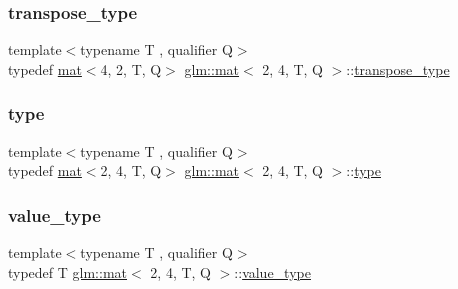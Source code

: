 \mbox{\label{structglm_1_1mat_3_012_00_014_00_01_t_00_01_q_01_4_a5030a7f34454a6871ed17c1b27cc0929}} 
\subsubsection{\texorpdfstring{transpose\+\_\+type}{transpose\_type}}
{\footnotesize\ttfamily template$<$typename T , qualifier Q$>$ \\
typedef \mbox{\hyperlink{structglm_1_1mat}{mat}}$<$4, 2, T, Q$>$ \mbox{\hyperlink{structglm_1_1mat}{glm\+::mat}}$<$ 2, 4, T, Q $>$\+::\mbox{\hyperlink{structglm_1_1mat_3_012_00_014_00_01_t_00_01_q_01_4_a5030a7f34454a6871ed17c1b27cc0929}{transpose\+\_\+type}}}

\mbox{\label{structglm_1_1mat_3_012_00_014_00_01_t_00_01_q_01_4_a04c04d7f08549f03063d04bca3a76ae5}} 
\subsubsection{\texorpdfstring{type}{type}}
{\footnotesize\ttfamily template$<$typename T , qualifier Q$>$ \\
typedef \mbox{\hyperlink{structglm_1_1mat}{mat}}$<$2, 4, T, Q$>$ \mbox{\hyperlink{structglm_1_1mat}{glm\+::mat}}$<$ 2, 4, T, Q $>$\+::\mbox{\hyperlink{structglm_1_1mat_3_012_00_014_00_01_t_00_01_q_01_4_a04c04d7f08549f03063d04bca3a76ae5}{type}}}

\mbox{\label{structglm_1_1mat_3_012_00_014_00_01_t_00_01_q_01_4_a837bd82ca90340b03c7ee19f598c5133}} 
\subsubsection{\texorpdfstring{value\+\_\+type}{value\_type}}
{\footnotesize\ttfamily template$<$typename T , qualifier Q$>$ \\
typedef T \mbox{\hyperlink{structglm_1_1mat}{glm\+::mat}}$<$ 2, 4, T, Q $>$\+::\mbox{\hyperlink{structglm_1_1mat_3_012_00_014_00_01_t_00_01_q_01_4_a837bd82ca90340b03c7ee19f598c5133}{value\+\_\+type}}}




